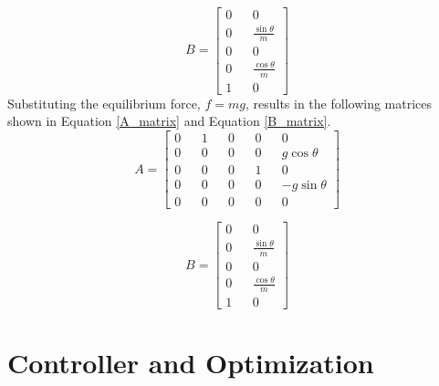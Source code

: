 \documentclass[12pt]{article}
\begin{document}
\begin{equation}
\label{B_matrix_intermediate}
B = \begin{bmatrix} 0 && 0 \\ 0 && \frac{\sin{\theta}}{m} \\ 0 && 0 \\ 0 && \frac{\cos{\theta}}{m} \\ 1 && 0 \end{bmatrix}
\end{equation}
Substituting the equilibrium force, $f = mg$, results in the following matrices shown in Equation \ref{A_matrix} and Equation \ref{B_matrix}.
\begin{equation}
\label{A_matrix}
A = \begin{bmatrix} 0 && 1 && 0 && 0 && 0 \\ 0 && 0 && 0 && 0 && g\cos{\theta} \\  0 && 0 && 0 && 1 && 0 \\ 0 && 0 && 0 && 0 && -g\sin{\theta} \\ 0 && 0 && 0 && 0 && 0 \end{bmatrix}
\end{equation}

\begin{equation}
\label{B_matrix}
B = \begin{bmatrix} 0 && 0 \\ 0 && \frac{\sin{\theta}}{m} \\ 0 && 0 \\ 0 && \frac{\cos{\theta}}{m} \\ 1 && 0 \end{bmatrix}
\end{equation}


\section{Controller and Optimization}
\end{document}
